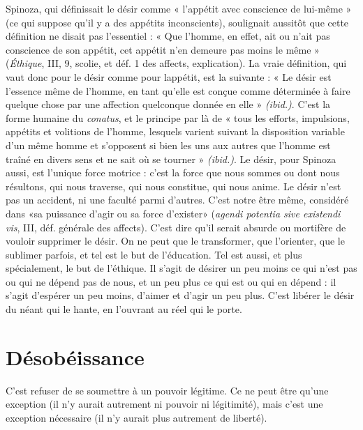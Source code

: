 Spinoza, qui définissait le désir comme « l’appétit avec conscience de lui-même »
(ce qui suppose qu’il y a des appétits inconscients), soulignait aussitôt
que cette définition ne disait pas l’essentiel : « Que l’homme, en effet, ait ou
n'ait pas conscience de son appétit, cet appétit n’en demeure pas moins le
même » ({\it Éthique}, III, 9, scolie, et déf. 1 des affects, explication). La vraie définition,
qui vaut donc pour le désir comme pour lappétit, est la suivante : « Le
désir est l’essence même de l’homme, en tant qu’elle est conçue comme déterminée
à faire quelque chose par une affection quelconque donnée en elle »
{\it (ibid.)}. C’est la forme humaine du {\it conatus}, et le principe par là de « tous les
efforts, impulsions, appétits et volitions de l’homme, lesquels varient suivant la
disposition variable d’un même homme et s’opposent si bien les uns aux autres
que l’homme est traîné en divers sens et ne sait où se tourner » {\it (ibid.)}. Le désir,
pour Spinoza aussi, est l’unique force motrice : c’est la force que nous sommes
ou dont nous résultons, qui nous traverse, qui nous constitue, qui nous anime.
Le désir n’est pas un accident, ni une faculté parmi d’autres. C’est notre être
même, considéré dans «sa puissance d’agir ou sa force d'exister» ({\it agendi
potentia sive existendi vis}, III, déf. générale des affects). C’est dire qu'il serait
absurde ou mortifère de vouloir supprimer le désir. On ne peut que le transformer,
que l’orienter, que le sublimer parfois, et tel est le but de l’éducation.
Tel est aussi, et plus spécialement, le but de l’éthique. Il s’agit de désirer un peu
moins ce qui n’est pas ou qui ne dépend pas de nous, et un peu plus ce qui est
ou qui en dépend : il s’agit d’espérer un peu moins, d’aimer et d’agir un peu
plus. C’est libérer le désir du néant qui le hante, en l’ouvrant au réel qui le
porte.

\section{Désobéissance}
C’est refuser de se soumettre à un pouvoir légitime. Ce
ne peut être qu’une exception (il n’y aurait autrement
ni pouvoir ni légitimité), mais c’est une exception nécessaire (il n’y aurait plus
autrement de liberté).

